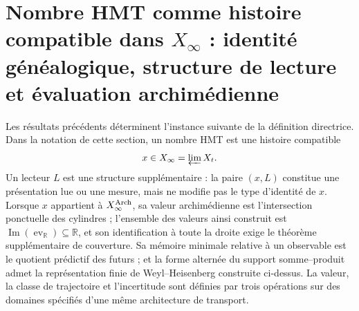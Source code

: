 \section{Nombre HMT comme histoire compatible dans \(X_\infty\) : identité généalogique, structure de lecture et évaluation archimédienne}

Les résultats précédents déterminent l'instance suivante de la définition
directrice. Dans la notation de cette section, un nombre HMT est une histoire
compatible
\[
x\in X_\infty=\varprojlim X_t.
\]
Un lecteur \(L\) est une structure supplémentaire : la paire \((x,L)\) constitue une
présentation lue ou une mesure, mais ne modifie pas le type d'identité de
\(x\). Lorsque \(x\) appartient à \(X_\infty^{\rm Arch}\), sa valeur
archimédienne est l'intersection ponctuelle des cylindres ; l'ensemble des
valeurs ainsi construit est
\(\operatorname{Im}(\operatorname{ev}_{\mathbb R})\subseteq\mathbb R\), et
son identification à toute la droite exige le théorème supplémentaire de couverture.
Sa mémoire minimale relative à un observable est le quotient prédictif des
futurs ; et la forme alternée du support somme--produit admet la
représentation finie de Weyl--Heisenberg construite ci-dessus. La valeur, la classe de trajectoire et l'incertitude sont
définies par trois opérations sur des domaines spécifiés d'une même
architecture de transport.

